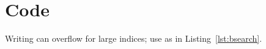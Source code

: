 \section{Code}






\begin{warnbox}[Pitfall]
Writing  can overflow for large indices; use
 as in Listing~\ref{lst:bsearch}.
\end{warnbox}
